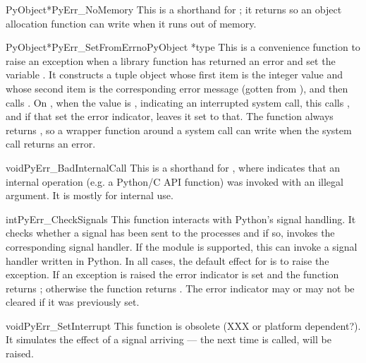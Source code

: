 \documentclass{manual}
\begin{document}
\begin{cfuncdesc}{PyObject*}{PyErr_NoMemory}{}
This is a shorthand for ; it
returns \NULL{} so an object allocation function can write
 when it runs out of memory.
\end{cfuncdesc}

\begin{cfuncdesc}{PyObject*}{PyErr_SetFromErrno}{PyObject *type}
This is a convenience function to raise an exception when a \C{} library
function has returned an error and set the \C{} variable .
It constructs a tuple object whose first item is the integer
 value and whose second item is the corresponding error
message (gotten from ), and then calls
.  On \UNIX{}, when
the  value is , indicating an interrupted
system call, this calls , and if that set
the error indicator, leaves it set to that.  The function always
returns \NULL{}, so a wrapper function around a system call can write 
 when  the system call returns an
error.
\end{cfuncdesc}

\begin{cfuncdesc}{void}{PyErr_BadInternalCall}{}
This is a shorthand for , where  indicates that an internal
operation (e.g. a Python/C API function) was invoked with an illegal
argument.  It is mostly for internal use.
\end{cfuncdesc}

\begin{cfuncdesc}{int}{PyErr_CheckSignals}{}
This function interacts with Python's signal handling.  It checks
whether a signal has been sent to the processes and if so, invokes the
corresponding signal handler.  If the
 module is supported, this can
invoke a signal handler written in Python.  In all cases, the default
effect for  is to raise the
 exception.  If an exception is raised the 
error indicator is set and the function returns ; otherwise
the function returns .  The error indicator may or may not be
cleared if it was previously set.
\end{cfuncdesc}

\begin{cfuncdesc}{void}{PyErr_SetInterrupt}{}
This function is obsolete (XXX or platform dependent?).  It simulates
the effect of a  signal arriving --- the next time
 is called,
 will be raised.
\end{cfuncdesc}
\end{document}
